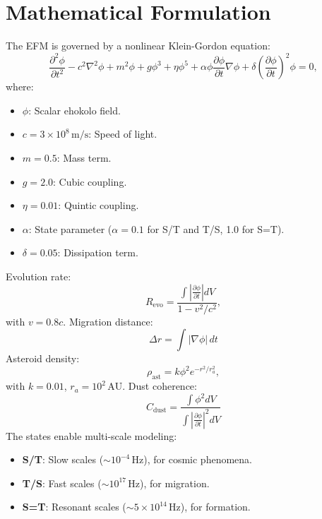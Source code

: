 \documentclass[11pt]{article}
\begin{document}
\section{Mathematical Formulation}
The EFM is governed by a nonlinear Klein-Gordon equation:
\begin{equation}
\frac{\partial^2 \phi}{\partial t^2} - c^2 \nabla^2 \phi + m^2 \phi + g \phi^3 + \eta \phi^5 + \alpha \phi \frac{\partial \phi}{\partial t} \nabla \phi + \delta \left(\frac{\partial \phi}{\partial t}\right)^2 \phi = 0,
\end{equation}
where:
\begin{itemize}
    \item \(\phi\): Scalar ehokolo field.
    \item \(c = 3 \times 10^8 \, \text{m/s}\): Speed of light.
    \item \(m = 0.5\): Mass term.
    \item \(g = 2.0\): Cubic coupling.
    \item \(\eta = 0.01\): Quintic coupling.
    \item \(\alpha\): State parameter (\(\alpha = 0.1\) for S/T and T/S, 1.0 for S=T).
    \item \(\delta = 0.05\): Dissipation term.
\end{itemize}
Evolution rate:
\begin{equation}
R_{\text{evo}} = \frac{\int \left| \frac{\partial \phi}{\partial t} \right| dV}{1 - v^2 / c^2},
\end{equation}
with \(v = 0.8c\). Migration distance:
\begin{equation}
\Delta r = \int |\nabla \phi| \, dt
\end{equation}
Asteroid density:
\begin{equation}
\rho_{\text{ast}} = k \phi^2 e^{-r^2 / r_a^2},
\end{equation}
with \(k = 0.01\), \(r_a = 10^2 \, \text{AU}\). Dust coherence:
\begin{equation}
C_{\text{dust}} = \frac{\int \phi^2 dV}{\int \left| \frac{\partial \phi}{\partial t} \right|^2 dV}
\end{equation}
The states enable multi-scale modeling:
\begin{itemize}
    \item \textbf{S/T}: Slow scales (\(\sim 10^{-4} \, \text{Hz}\)), for cosmic phenomena.
    \item \textbf{T/S}: Fast scales (\(\sim 10^{17} \, \text{Hz}\)), for migration.
    \item \textbf{S=T}: Resonant scales (\(\sim 5 \times 10^{14} \, \text{Hz}\)), for formation.
\end{itemize}
\end{document}
